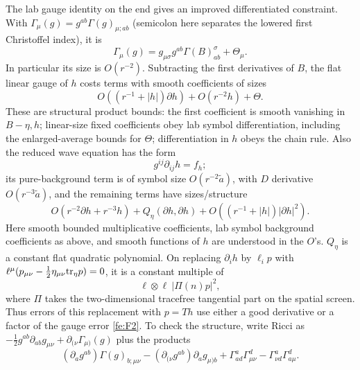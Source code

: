 The lab gauge identity on the end gives an improved differentiated constraint. With \(\Gamma_\mu(g)=g^{ab}\Gamma(g)_{\mu;ab}\) (semicolon here separates the lowered first Christoffel index), it is
\begin{equation*}
\Gamma_\mu(g)=g_{\mu\sigma}g^{ab}\Gamma(B)^\sigma_{ab}+\Theta_\mu .
\end{equation*}
In particular its size is \(O(r^{-2})\). Subtracting the first derivatives of \(B\), the flat linear gauge of \(h\) costs terms with smooth coefficients of sizes
\begin{equation}\label{fe:F2}
O((r^{-1}+|h|)\partial h)+O(r^{-2}h)+\Theta .
\end{equation}
These are structural product bounds: the first coefficient is smooth vanishing in \(B-\eta,h\); linear-size fixed coefficients obey lab symbol differentiation, including the enlarged-average bounds for \(\Theta\); differentiation in \(h\) obeys the chain rule. Also the reduced wave equation has the form
\begin{equation*}
g^{ij}\partial_{ij}h=f_h ;
\end{equation*}
its pure-background term is of symbol size \(O(r^{-2}\widetilde a)\), with \(D\) derivative \(O(r^{-3}\widetilde a)\), and the remaining terms have sizes/structure
\begin{equation}\label{fe:F3}
O(r^{-2}\partial h+r^{-3}h)+Q_\eta(\partial h,\partial h)
                    +O((r^{-1}+|h|)|\partial h|^2).
\end{equation}
Here smooth bounded multiplicative coefficients, lab symbol background coefficients as above, and smooth functions of \(h\) are understood in the \(O\)'s. \(Q_\eta\) is a constant flat quadratic polynomial. On replacing \(\partial_i h\) by \(\ell_i p\) with \(\ell^\mu(p_{\mu\nu}-\frac12\eta_{\mu\nu}{\rm tr}_\eta p)=0\), it is a constant multiple of
\begin{equation*}
\ell\otimes\ell\ |\Pi(n)p|^2 ,
\end{equation*}
where \(\Pi\) takes the two-dimensional tracefree tangential part on the spatial screen. Thus errors of this replacement with \(p=T h\) use either a good derivative or a factor of the gauge error \eqref{fe:F2}. To check the structure, write Ricci as \(-\tfrac12 g^{ab}\partial_{ab}g_{\mu\nu}+\partial_{(\nu}\Gamma_{\mu)}(g)\) plus the products
\begin{equation*}
(\partial_a g^{ab})\Gamma(g)_{b;\mu\nu}
 -(\partial_{(\nu}g^{ab})\partial_a g_{\mu)b}
 +\Gamma^a_{a d}\Gamma^d_{\mu\nu}-\Gamma^a_{\nu d}\Gamma^d_{a\mu}.
\end{equation*}
